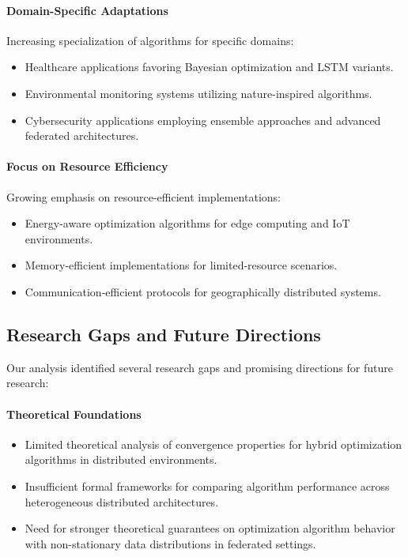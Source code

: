 \paragraph{Domain-Specific Adaptations}
Increasing specialization of algorithms for specific domains:
\begin{itemize}
    \item Healthcare applications favoring Bayesian optimization and LSTM variants.
    
    \item Environmental monitoring systems utilizing nature-inspired algorithms.
    
    \item Cybersecurity applications employing ensemble approaches and advanced federated architectures.
\end{itemize}

\paragraph{Focus on Resource Efficiency}
Growing emphasis on resource-efficient implementations:
\begin{itemize}
    \item Energy-aware optimization algorithms for edge computing and IoT environments.
    
    \item Memory-efficient implementations for limited-resource scenarios.
    
    \item Communication-efficient protocols for geographically distributed systems.
\end{itemize}

\subsection{Research Gaps and Future Directions}
Our analysis identified several research gaps and promising directions for future research:

\paragraph{Theoretical Foundations}
\begin{itemize}
    \item Limited theoretical analysis of convergence properties for hybrid optimization algorithms in distributed environments.
    
    \item Insufficient formal frameworks for comparing algorithm performance across heterogeneous distributed architectures.
    
    \item Need for stronger theoretical guarantees on optimization algorithm behavior with non-stationary data distributions in federated settings.
\end{itemize}

